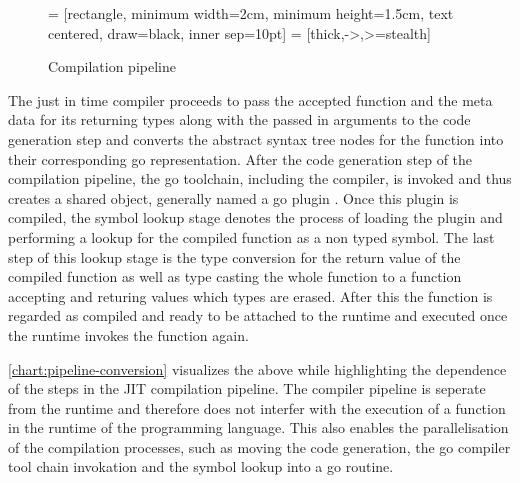 \begin{figure}[H]
     = [rectangle, minimum width=2cm, minimum height=1.5cm, text centered, draw=black, inner sep=10pt]
     = [thick,->,>=stealth]
    \centering
    \caption{Compilation pipeline}
    \label{chart:pipeline-conversion}
\end{figure}

The just in time compiler proceeds to pass the accepted function and the meta
data for its returning types along with the passed in arguments to the code
generation step and converts the abstract syntax tree nodes for the function
into their corresponding go representation. After the code generation step of
the compilation pipeline, the go toolchain, including the compiler, is invoked
and thus creates a shared object, generally named a go plugin \cite{go_plugin}.
Once this plugin is compiled, the symbol lookup stage denotes the process of
loading the plugin and performing a lookup for the compiled function as a non
typed symbol. The last step of this lookup stage is the type conversion for the
return value of the compiled function as well as type casting the whole
function to a function accepting and returing values which types are erased.
After this the function is regarded as compiled and ready to be attached to the
runtime and executed once the runtime invokes the function again.

\autoref{chart:pipeline-conversion} visualizes the above while highlighting the
dependence of the steps in the JIT compilation pipeline. The compiler pipeline
is seperate from the runtime and therefore does not interfer with the execution
of a function in the runtime of the programming language. This also enables the
parallelisation of the compilation processes, such as moving the code
generation, the go compiler tool chain invokation and the symbol lookup into a
go routine.
